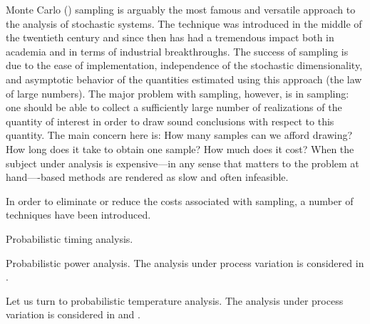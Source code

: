 Monte Carlo () sampling \cite{xiu2010} is arguably the most famous and
versatile approach to the analysis of stochastic systems. The technique was
introduced in the middle of the twentieth century and since then has had a
tremendous impact both in academia and in terms of industrial breakthroughs. The
success of  sampling is due to the ease of implementation, independence
of the stochastic dimensionality, and asymptotic behavior of the quantities
estimated using this approach (the law of large numbers). The major problem with
 sampling, however, is in sampling: one should be able to collect a
sufficiently large number of realizations of the quantity of interest in order
to draw sound conclusions with respect to this quantity. The main concern here
is: How many samples can we afford drawing? How long does it take to obtain one
sample? How much does it cost? When the subject under analysis is expensive---in
any sense that matters to the problem at hand----based methods are
rendered as slow and often infeasible.

In order to eliminate or reduce the costs associated with  sampling, a
number of techniques have been introduced.

Probabilistic timing analysis.

Probabilistic power analysis. The analysis under process variation is considered
in \cite{ukhov2014}.

Let us turn to probabilistic temperature analysis. The analysis under process
variation is considered in \cite{ukhov2014} and \cite{ukhov2015}.
